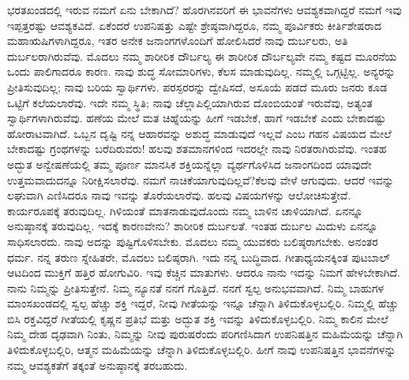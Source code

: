 ಭರತಖಂಡದಲ್ಲಿ ಇರುವ ನಮಗೆ ಏನು ಬೇಕಾಗಿದೆ? ಹೊರಗಿನವರಿಗೆ ಈ ಭಾವನೆಗಳು ಆವಶ್ಯಕವಾಗಿದ್ದರೆ ನಮಗೆ ಇವು ಇಪ್ಪತ್ತರಷ್ಟು ಆವಶ್ಯಕವಿದೆ. ಏಕೆಂದರೆ ಉಪನಿಷತ್ತು ಎಷ್ಟೇ ಶ್ರೇಷ್ಠವಾಗಿದ್ದರೂ, ನಮ್ಮ ಪೂರ್ವಿಕರು ಕೀರ್ತಿಶೇಷರಾದ ಮಹಾಋಷಿಗಳಾಗಿದ್ದರೂ, ಇತರ ಅನೇಕ ಜನಾಂಗಗಳೊಂದಿಗೆ ಹೋಲಿಸಿದರೆ ನಾವು ದುರ್ಬಲರು, ಅತಿ ದುರ್ಬಲರಾಗಿರುವೆವು. ಮೊದಲು ನಮ್ಮ ಶಾರೀರಿಕ ದೌರ್ಬಲ್ಯ ಈ ಶಾರೀರಿಕ ದೌರ್ಬಲ್ಯವೇ ನಮ್ಮ ಕಷ್ಟದ ಮೂರನೆಯ ಒಂದು ಪಾಲಿಗಾದರೂ ಕಾರಣ. ನಾವು ಶುದ್ಧ ಸೋಮಾರಿಗಳು, ಕೆಲಸ ಮಾಡುವುದಿಲ್ಲ. ನಮ್ಮಲ್ಲಿ ಒಗ್ಗಟ್ಟಿಲ್ಲ. ಅನ್ಯರನ್ನು ಪ್ರೀತಿಸುವುದಿಲ್ಲ; ನಾವು ಬರಿಯ ಸ್ವಾರ್ಥಿಗಳು. ಪರಸ್ಪರರನ್ನು ದ್ವೇಷಿಸದೆ, ಅಸೂಯೆ ಪಡದೆ ಮೂರು ಜನರು ಕೂಡ ಒಟ್ಟಿಗೆ ಕಲೆಯಲಾರೆವು. ಇದೇ ನಮ್ಮ ಸ್ಥಿತಿ; ನಾವು ಚೆಲ್ಲಾಪಿಲ್ಲಿಯಾಗಿರುವ ದೊಂಬಿಯಂತೆ ಇರುವೆವು, ಅತ್ಯಂತ ಸ್ವಾರ್ಥಿಗಳಾಗಿರುವೆವು. ಹಣೆಯ ಮೇಲೆ ಮತ ಚಿಹ್ನೆಯನ್ನು ಹೀಗೆ ಇಡಬೇಕೆ, ಹಾಗೆ ಇಡಬೇಕೆ ಎಂದು ಬೇಕಾದಷ್ಟು ಹೋರಾಟವಾಗಿದೆ. ಒಬ್ಬನ ದೃಷ್ಟಿ ನನ್ನ ಆಹಾರವನ್ನು ಅಶುದ್ಧ ಮಾಡುವುದೆ ಇಲ್ಲವೆ ಎಂಬ ಗಹನ ವಿಷಯದ ಮೇಲೆ ಬೇಕಾದಷ್ಟು ಗ್ರಂಥಗಳನ್ನು ಬರೆದಿರುವರು! ಹಲವು ಶತಮಾನಗಳಿಂದ ಇದರಲ್ಲೇ ನಾವು ನಿರತರಾಗಿರುವೆವು. ಇಂತಹ ಅದ್ಭುತ ಅನ್ವೇಷಣೆಯಲ್ಲಿ ತಮ್ಮ ಪೂರ್ಣ ಮಾನಸಿಕ ಶಕ್ತಿಯನ್ನೆಲ್ಲಾ ವ್ಯರ್ಥಗೊಳಿಸಿದ ಜನಾಂಗದಿಂದ ಯಾವುದೇ ಉತ್ತಮವಾದುದನ್ನೂ ನಿರೀಕ್ಷಿಸಲಾರೆವು. ನಮಗೆ ನಾಚಿಕೆಯಾಗುವುದಿಲ್ಲವೆ?ಕೆಲವು ವೇಳೆ ಆಗುವುದು. ಆದರೆ ಇವನ್ನು ಲಘುವಾಗಿ ಎಣಿಸಿದರೂ ನಾವು ಇವನ್ನು ತೊರೆಯಲಾರೆವು. ಹಲವು ವಿಷಯಗಳನ್ನು ಆಲೋಚಿಸುತ್ತೇವೆ. ಕಾರ್ಯರೂಪಕ್ಕೆ ತರುವುದಿಲ್ಲ. ಗಿಳಿಯಂತೆ ಮಾತನಾಡುವುದೊಂದು ನಮ್ಮ ಬಾಳಿನ ಚಾಳಿಯಾಗಿದೆ. ಏನನ್ನೂ ಅನುಷ್ಠಾನಕ್ಕೆ ತರುವುದಿಲ್ಲ. ಇದಕ್ಕೆ ಕಾರಣವೇನು? ಶಾರೀರಿಕ ದುರ್ಬಲತೆ. ಇಂತಹ ದುರ್ಬಲ ಮಿದುಳು ಏನನ್ನೂ ಸಾಧಿಸಲಾರದು. ನಾವು ಅದನ್ನು ಪುಷ್ಟಿಗೊಳಿಸಬೇಕು. ಮೊದಲು ನಮ್ಮ ಯುವಕರು ಬಲಿಷ್ಠರಾಗಬೇಕು. ಅನಂತರ ಧರ್ಮ. ನನ್ನ ತರುಣ ಸ್ನೇಹಿತರೇ, ಮೊದಲು ಬಲಿಷ್ಠರಾಗಿ. ಇದು ನನ್ನ ಬುದ್ಧಿವಾದ. ಗೀತಾಧ್ಯಯನಕ್ಕಿಂತ ಪುಟಬಾಲ್​ ಆಟದಿಂದ ಮುಕ್ತಿಗೆ ಹತ್ತಿರ ಹೋಗುವಿರಿ. ಇವು ಕೆಚ್ಚಿನ ಮಾತುಗಳು. ಆದರೂ ನಾನು ಇದನ್ನು ನಿಮಗೆ ಹೇಳಬೇಕಾಗಿದೆ. ನಾನು ನಿಮ್ಮನ್ನು ಪ್ರೀತಿಸುತ್ತೇನೆ. ನಿಮ್ಮ ನ್ಯೂನತೆ ನನಗೆ ಗೊತ್ತಿದೆ. ನನಗೆ ಸ್ವಲ್ಪ ಅನುಭವವಾಗಿದೆ. ನಿಮ್ಮ ಬಾಹುಗಳ ಮಾಂಸಖಂಡದಲ್ಲಿ ಸ್ವಲ್ಪ ಹೆಚ್ಚು ಶಕ್ತಿ ಇದ್ದರೆ, ನೀವು ಗೀತೆಯನ್ನು ಇನ್ನೂ ಚೆನ್ನಾಗಿ ತಿಳಿದುಕೊಳ್ಳಬಲ್ಲಿರಿ. ನಿಮ್ಮಲ್ಲಿ ಹೆಚ್ಚು ಬಿಸಿ ರಕ್ತವಿದ್ದರೆ ಗೀತೆಯಲ್ಲಿ ಕೃಷ್ಣನ ಪ್ರತಿಭೆ ಮತ್ತು ಅದ್ಭುತ ಶಕ್ತಿ ಇವನ್ನು ತಿಳಿದುಕೊಳ್ಳಬಲ್ಲಿರಿ. ನಿಮ್ಮ ಕಾಲಿನ ಮೇಲೆ ನಿಮ್ಮ ದೇಹ ದೃಢವಾಗಿ ನಿಂತು, ನಿಮ್ಮನ್ನು ನೀವು ಪುರುಷರೆಂದು ಪರಿಗಣಿಸಿದಾಗ ಉಪನಿಷತ್ತಿನ ಮಹಿಮೆಯನ್ನು ಚೆನ್ನಾಗಿ ತಿಳಿದುಕೊಳ್ಳಬಲ್ಲಿರಿ, ಆತ್ಮನ ಮಹಿಮೆಯನ್ನು ಚೆನ್ನಾಗಿ ತಿಳಿದುಕೊಳ್ಳಬಲ್ಲಿರಿ. ಹೀಗೆ ನಾವು ಉಪನಿಷತ್ತಿನ ಭಾವನೆಗಳನ್ನು ನಮ್ಮ ಆವಶ್ಯಕತೆಗೆ ತಕ್ಕಂತೆ ಅನುಷ್ಠಾನಕ್ಕೆ ತರಬಹುದು.

\vskip   4pt


